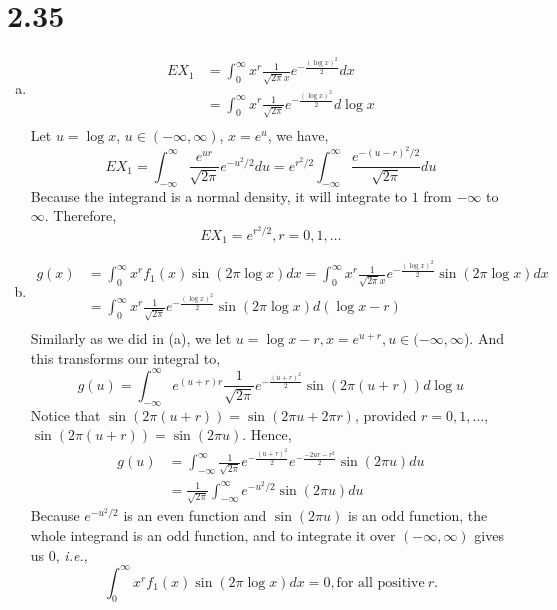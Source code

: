 \documentclass[letter]{article}
\newcommand{\intii}{\int_{-\infty}^\infty}
\newcommand{\intzi}{\int_0^\infty}
\begin{document}
    \section*{2.35}
    \begin{enumerate}[(a)]
    \item
    \begin{align*}
    EX_1 & = \intzi x^r \frac{1}{\sqrt{2\pi}x} e^{-\frac{(\log x)^2}{2}} dx \\
    & = \intzi x^r \frac{1}{\sqrt{2\pi}} e^{-\frac{(\log x)^2}{2}} d \log x\\
    \end{align*}
    Let $u = \log x$, $u \in (-\infty, \infty)$, $x = e^u$, we have,
    \[
    EX_1 = \intii \frac{e^{ur}}{\sqrt{2\pi}} e^{-u^2/2} du
    = e^{r^2/2} \intii \frac{e^{-(u-r)^2/2}}{\sqrt{2\pi}} du
    \]
    Because the integrand is a normal density, it will integrate to $1$ from $-\infty$ to $\infty$. Therefore,
    \[
    EX_1 = e^{r^2/2}, r = 0, 1, \dots
    \]
    \item 
    \begin{align*}
    g(x) & = \intzi x^r f_1(x) \sin(2\pi \log x)dx 
    = \intzi x^r \frac{1}{\sqrt{2\pi}x} e^{-\frac{(\log x)^2}{2}} \sin(2\pi \log x) dx \\
    & = \intzi x^r \frac{1}{\sqrt{2\pi}} e^{-\frac{(\log x)^2}{2}} \sin(2\pi \log x) d(\log x - r) \\
    \end{align*}
    Similarly as we did in (a), we let $u = \log x - r , x = e^{u+r}, u \in (-\infty, \infty$). And this transforms our integral to,
    \[
    g(u) = \intii e^{(u+r)r} \frac{1}{\sqrt{2\pi}} e^{-\frac{(u+r)^2}{2}} \sin(2\pi (u+r)) d\log u 
    \]
    Notice that $\sin(2 \pi(u+r)) = \sin(2\pi u + 2\pi r)$, provided $r = 0, 1, \dots$, $\sin(2 \pi(u+r)) = \sin(2\pi u)$. Hence,
    \begin{align*}
    g(u) & = \intii \frac{1}{\sqrt{2\pi}} e^{-\frac{(u+r)^2}{2}} 
    e^{-\frac{-2ur-r^2}{2}} \sin(2\pi u) du \\
    & = \frac{1}{\sqrt{2\pi}} \intii e^{-u^2/2} \sin(2\pi u) du
    \end{align*}
    Because $e^{-u^2/2}$ is an even function and $\sin(2\pi u)$ is an odd function, the whole integrand is an odd function, and to integrate it over $(-\infty, \infty)$ gives us $0$, \emph{i.e.},
    \[
    \intzi x^r f_1(x) \sin(2\pi \log x)dx = 0, \text{for all positive}~r.
    \]
    \end{enumerate}
\end{document}
